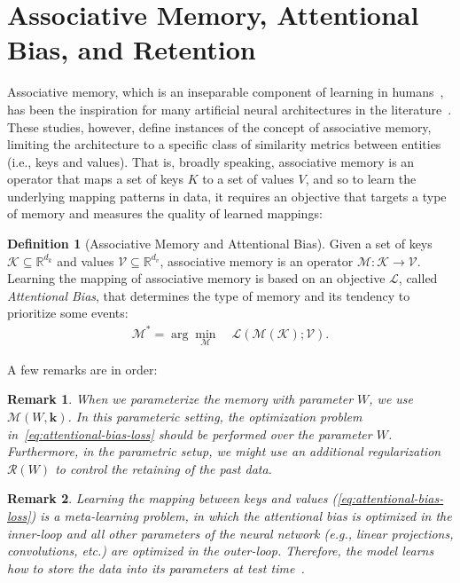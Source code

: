 \documentclass{article}
\newcommand{\citep}{\parencite}
\newcommand{\vk}[0]{\mathbf{k}}
\newcommand{\M}[0]{\mathcal{M}}
\newtheorem{remark}{Remark}
\theoremstyle{plain}
\theoremstyle{definition}
\newtheorem{definition}[theorem]{Definition}
\theoremstyle{remark}
\begin{document}
\section{Associative Memory, Attentional Bias, and Retention} \label{sec:AM}
Associative memory, which is an inseparable component of learning in humans~\citep{terry2017learning}, has been the inspiration for many artificial neural architectures in the literature~\citep{hopfield1982neural, neil2017delta, behrouz2024titans}. These studies, however, define instances of the concept of associative memory, limiting the architecture to a specific class of similarity metrics between entities (i.e., keys and values). That is, broadly speaking, associative memory is an operator that maps a set of keys $K$ to a set of values $V$, and so to learn the underlying mapping patterns in data, it requires an objective that targets a type of memory and measures the quality of learned mappings:

\begin{definition}[Associative Memory and Attentional Bias] \label{dfn:associative-memory}
Given a set of keys $\mathcal{K} \subseteq \mathbb{R}^{d_k}$ and values $\mathcal{V} \subseteq \mathbb{R}^{d_v}$, associative memory is an operator $\M: \mathcal{K} \rightarrow \mathcal{V}$. Learning the mapping of associative memory is based on an objective $\mathcal{L}$, called \emph{Attentional Bias}, that determines the type of memory and its tendency to prioritize some events:
\begin{align}\label{eq:attentional-bias-loss}
    \M^* = \arg\min_{\M}\quad \mathcal{L}(\M(\mathcal{K}); \mathcal{V}).
\end{align}
\end{definition}
A few remarks are in order:
\begin{remark}\label{remark:regularization}
 When we parameterize the memory with parameter $W$, we use $\M(W,\vk)$. In this parameteric setting,  the optimization problem in~\eqref{eq:attentional-bias-loss} should be performed over the parameter $W$. Furthermore, in the parametric setup, we might use an additional regularization $\mathcal{R}(W)$ to control the retaining of the past data.
\end{remark} 

\begin{remark}
Learning the mapping between keys and values (\autoref{eq:attentional-bias-loss}) is a meta-learning problem, in which the attentional bias is optimized in the inner-loop and all other parameters of the neural network (e.g., linear projections, convolutions, etc.) are optimized in the outer-loop. Therefore, the model learns how to store the data into its parameters at test time~\citep{sun2024learning, behrouz2024titans}.
\end{remark}
\end{document}
